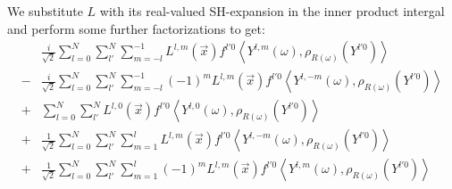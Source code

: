 \documentclass[10pt]{scrartcl}
\begin{document}
We substitute $L$ with its real-valued SH-expansion in the inner product intergal and perform some further factorizations to get:
\begin{align*}
&
\frac{i}{\sqrt{2}}
\sum_{l=0}^{N}{
\sum_{l'}^{N}{
\sum_{m=-l}^{-1}{
L^{{l,m}}\left (\vec{x} \right )
f^{l'0}
\left<
Y^{l, m}(\omega )
, \rho_{R\left(\omega\right)}
\left(
Y^{l'0}
\right)
\right>
}
}
}
\\
-
&
\frac{i}{\sqrt{2}}
\sum_{l=0}^{N}{
\sum_{l'}^{N}{
\sum_{m=-l}^{-1}{
\left({-1}\right)^{m}
L^{{l,m}}\left (\vec{x} \right )
f^{l'0}
\left<
Y^{l, -m}(\omega )
, \rho_{R\left(\omega\right)}
\left(
Y^{l'0}
\right)
\right>
}
}
}
\\
+
&
\sum_{l=0}^{N}{
\sum_{l'}^{N}{
L^{{l,0}}\left (\vec{x} \right )
f^{l'0}
\left<
Y^{l, 0}(\omega )
, \rho_{R\left(\omega\right)}
\left(
Y^{l'0}
\right)
\right>
}
}
\\
+
&
\frac{1}{\sqrt{2}}
\sum_{l=0}^{N}{
\sum_{l'}^{N}{
\sum_{m=1}^{l}{
L^{{l,m}}\left (\vec{x} \right )
f^{l'0}
\left<
Y^{l, -m}(\omega )
, \rho_{R\left(\omega\right)}
\left(
Y^{l'0}
\right)
\right>
}
}
}
\\
+
&
\frac{1}{\sqrt{2}}
\sum_{l=0}^{N}{
\sum_{l'}^{N}{
\sum_{m=1}^{l}{
\left({-1}\right)^{m}
L^{{l,m}}\left (\vec{x} \right )
f^{l'0}
\left<
Y^{l, m}(\omega )
, \rho_{R\left(\omega\right)}
\left(
Y^{l'0}
\right)
\right>
}
}
}
\end{align*}
\end{document}
